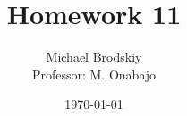


\title{Homework 11}
\date{\today}
\author{Michael Brodskiy\\ \small Professor: M. Onabajo}



\maketitle


